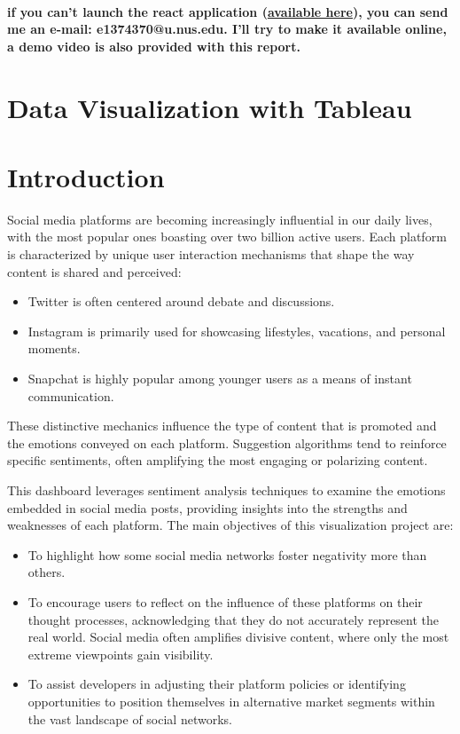 \documentclass[a4paper,12pt,titlepage,leqno]{article}
\begin{document}
\newpage
\tableofcontents
~

\newpage

{\color{red}\textbf{if you can't launch the react application (\href{https://github.com/jean334/InfoViz_Assignement2}{available here}), you can send me an e-mail: e1374370@u.nus.edu. I'll try to make it available online, a demo video is also provided with this report.}}

\section{Data Visualization with Tableau}

\section{Introduction}

Social media platforms are becoming increasingly influential in our daily lives, with the most popular ones boasting over two billion active users. Each platform is characterized by unique user interaction mechanisms that shape the way content is shared and perceived:

\begin{itemize}
    \item Twitter is often centered around debate and discussions.
    \item Instagram is primarily used for showcasing lifestyles, vacations, and personal moments.
    \item Snapchat is highly popular among younger users as a means of instant communication.
\end{itemize}

These distinctive mechanics influence the type of content that is promoted and the emotions conveyed on each platform. Suggestion algorithms tend to reinforce specific sentiments, often amplifying the most engaging or polarizing content.

This dashboard leverages sentiment analysis techniques to examine the emotions embedded in social media posts, providing insights into the strengths and weaknesses of each platform. The main objectives of this visualization project are:

\begin{itemize}
    \item To highlight how some social media networks foster negativity more than others.
    \item To encourage users to reflect on the influence of these platforms on their thought processes, acknowledging that they do not accurately represent the real world. Social media often amplifies divisive content, where only the most extreme viewpoints gain visibility.
    \item To assist developers in adjusting their platform policies or identifying opportunities to position themselves in alternative market segments within the vast landscape of social networks.
\end{itemize}
\end{document}
